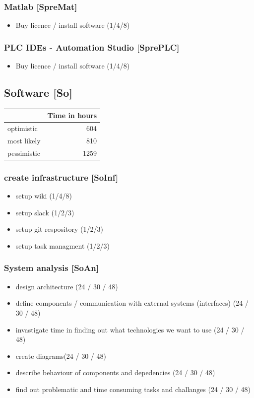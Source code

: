 \subsubsection{Matlab [SpreMat]}
\label{sec:orgda25cf6}
\begin{itemize}
\item Buy licence / install software  (1/4/8)
\end{itemize}

\subsubsection{PLC IDEs - Automation Studio [SprePLC]}
\label{sec:org003d4a8}
\begin{itemize}
\item Buy licence / install software (1/4/8)
\end{itemize}

\subsection{Software [So]}
\label{sec:orgdf36b5c}

\begin{center}
\begin{tabular}{|l|r|}
	\hline
	& Time in hours\\
	\hline
	optimistic & 604\\
	\hline
	most likely & 810\\
	\hline
	pessimistic & 1259\\
	\hline
\end{tabular}
\end{center}
\subsubsection{create infrastructure [SoInf]}
\label{sec:org06c00a2}
\begin{itemize}
\item setup wiki (1/4/8)
\item setup slack (1/2/3)
\item setup git respository (1/2/3)
\item setup task managment (1/2/3)
\end{itemize}
\subsubsection{System analysis [SoAn]}
\label{sec:org498acda}
\begin{itemize}
\item design architecture (24 / 30 / 48)
\item define components / communication with external systems (interfaces) (24 / 30 / 48)
\item invastigate time in finding out what technologies we want to use (24 / 30 / 48)
\item create diagrams(24 / 30 / 48)
\item describe behaviour of components and depedencies (24 / 30 / 48)
\item find out problematic and time consuming tasks and challanges (24 / 30 / 48)
\end{itemize}

